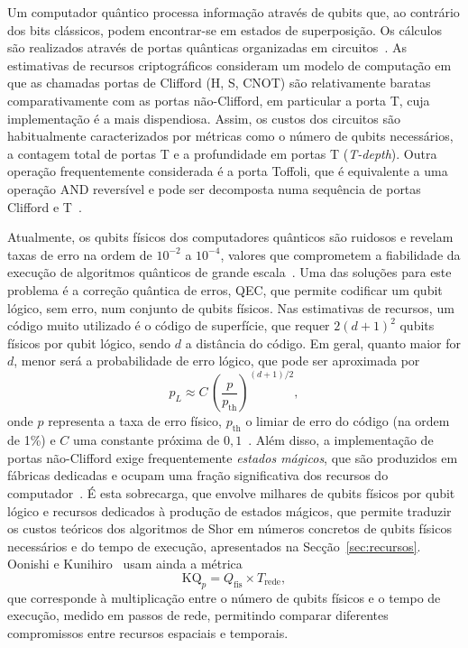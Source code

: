 \documentclass[11pt,a4paper]{article}
\begin{document}
Um computador quântico processa informação através de qubits que, ao contrário dos bits clássicos, podem encontrar-se em estados de superposição. Os cálculos são realizados através de portas quânticas organizadas em circuitos~\cite{chethana2025}. As estimativas de recursos criptográficos consideram um modelo de computação em que as chamadas portas de Clifford (H, S, CNOT) são relativamente baratas comparativamente com as portas não-Clifford, em particular a porta T, cuja implementação é a mais dispendiosa. Assim, os custos dos circuitos são habitualmente caracterizados por métricas como o número de qubits necessários, a contagem total de portas T e a profundidade em portas T (\emph{T-depth}). Outra operação frequentemente considerada é a porta Toffoli, que é equivalente a uma operação AND reversível e pode ser decomposta numa sequência de portas Clifford e T~\cite{huang2022,liu2023}.

Atualmente, os qubits físicos dos computadores quânticos são ruidosos e revelam taxas de erro na ordem de $10^{-2}$ a $10^{-4}$, valores que comprometem a fiabilidade da execução de algoritmos quânticos de grande escala~\cite{zhou2025}. Uma das soluções para este problema é a correção quântica de erros, QEC, que permite codificar um qubit lógico, sem erro, num conjunto de qubits físicos. Nas estimativas de recursos, um código muito utilizado é o código de superfície, que requer $2(d+1)^2$ qubits físicos por qubit lógico, sendo $d$ a distância do código. Em geral, quanto maior for $d$, menor será a probabilidade de erro lógico, que pode ser aproximada por
\begin{equation}\label{eq:surface}
p_L \approx C\,\left(\frac{p}{p_{\text{th}}}\right)^{(d+1)/2},
\end{equation}
onde $p$ representa a taxa de erro físico, $p_{\text{th}}$ o limiar de erro do código (na ordem de 1\%) e $C$ uma constante próxima de $0{,}1$~\cite{zhou2025}. Além disso, a implementação de portas não-Clifford exige frequentemente \emph{estados mágicos}, que são produzidos em fábricas dedicadas e ocupam uma fração significativa dos recursos do computador~\cite{zhou2025,oonishi2026}. É esta sobrecarga, que envolve milhares de qubits físicos por qubit lógico e recursos dedicados à produção de estados mágicos, que permite traduzir os custos teóricos dos algoritmos de Shor em números concretos de qubits físicos necessários e do tempo de execução, apresentados na Secção~\ref{sec:recursos}. Oonishi e Kunihiro~\cite{oonishi2026} usam ainda a métrica
\begin{equation}\label{eq:kqp}
\mathrm{KQ}_p = Q_{\text{fis}} \times T_{\text{rede}},
\end{equation}
que corresponde à multiplicação entre o número de qubits físicos e o tempo de execução, medido em passos de rede, permitindo comparar diferentes compromissos entre recursos espaciais e temporais.
\end{document}

